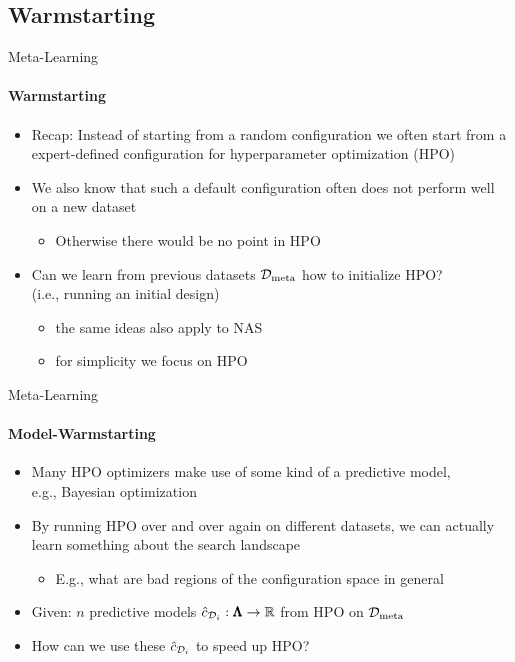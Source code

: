 \subsection{Warmstarting}
\begin{frame}[c]{Meta-Learning}
\framesubtitle{Warmstarting}
	
\begin{itemize}
	\item Recap: Instead of starting from a random configuration we often start from a expert-defined configuration for hyperparameter optimization (HPO)
	\pause
	\item We also know that such a default configuration often does not perform well on a new dataset
	\begin{itemize}
		\item Otherwise there would be no point in HPO
	\end{itemize}
	\pause
	\item \alert{Can we learn from previous datasets $\mathcal{D}_{\text{meta}}$ how to initialize HPO?}\\
	(i.e., running an initial design)
	\begin{itemize}
		\item the same ideas also apply to NAS
		\item for simplicity we focus on HPO 
	\end{itemize}
\end{itemize}

\end{frame}
\begin{frame}[c]{Meta-Learning}
\framesubtitle{Model-Warmstarting}

\begin{itemize}
	\item Many HPO optimizers make use of some kind of a predictive model,\\
	e.g., Bayesian optimization
	\item By running HPO over and over again on different datasets,
	we can actually learn something about the search landscape
	\begin{itemize}
		\item E.g., what are bad regions of the configuration space in general
	\end{itemize}
	\smallskip
	\item Given: $n$ predictive models $\hat{c}_{\mathcal{D}_i}: \pmb{\Lambda} \to \mathbb{R}$ from HPO on $\mathcal{D}_{\text{meta}}$	
	\item \alert{How can we use these $\hat{c}_{\mathcal{D}_i}$ to speed up HPO?}
\end{itemize}


\end{frame}

